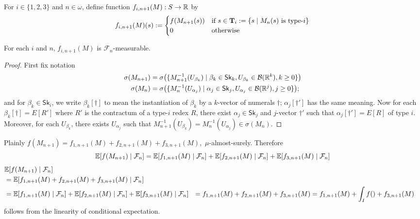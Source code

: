 \iffalse
For $i \in \{1, 2, 3\}$ and $n \in \omega$, define function $f_{i, n+1}(M) : S \to \mathbb{R}$ by
\[
f_{i, n+1}(M)(s) :=
\begin{cases}
f(M_{n+1}(s)) & \hbox{if }s \in \mathbf{T}_i := 
\{s \mid M_n(s) \textrm{ is type-$i$}\}\\
0 & \textrm{otherwise}
\end{cases}
\]
\begin{lemma}
\label{lem:inde}
For each $i$ and $n$, $f_{i, n+1}(M)$ is %
$\mathcal{F}_{n}$-measurable.
\end{lemma}

\begin{proof} First fix notation
\begin{align*}
\sigma(M_{n+1}) &= \sigma\big(\{M_{n+1}^{-1}(U_{\beta_k})
\mid \beta_k\in \mathsf{Sk}_k, U_{\beta_k} \in \mathcal{B}(\mathbb{R}^k), k \geq 0\}\big)\\
\sigma(M_{n}) &= \sigma\big(\{M_{n}^{-1}(U_{\alpha_j})
\mid \alpha_j\in \mathsf{Sk}_j, U_{\alpha_j} \in \mathcal{B}(\mathbb{R}^j), j \geq 0\}\big);
\end{align*}
and for $\beta_k \in \mathsf{Sk}_i$, we write $\beta_k[\dagger]$ to mean the instantiation of $\beta_k$ by a $k$-vector of numerals $\dagger$; $\alpha_j[\dagger']$ has the same meaning.
Now for each $\beta_k[\dagger] = E[R']$ where $R'$ is the contractum of a type-$i$ redex $R$, there exist $\alpha_j \in \mathsf{Sk}_j$ and $j$-vector $\dagger'$ such that $\alpha_j[\dagger'] = E[R]$ of type $i$.
Moreover, for each $U_{\beta_k}$, there exists $U_{\alpha_j}$ such that $M_{n+1}^{-1}(U_{\beta_k}) = M_{n}^{-1}(U_{\alpha_j}) \in \sigma(M_n)$.
\end{proof}

Plainly
\(
f(M_{n+1}) = %
f_{1, n+1}(M) + f_{2, n+1}(M) + f_{3, n+1}(M),
\)
$\mu$-almost-surely.
Therefore 
\[
\mathbb{E}[f(M_{n+1}) \mid \mathcal{F}_n] \nonumber \\
= 
\mathbb{E}[f_{1, n+1}(M) \mid \mathcal{F}_n] + \mathbb{E}[f_{2, n+1}(M) \mid \mathcal{F}_n] + \mathbb{E}[f_{3, n+1}(M) \mid \mathcal{F}_n] 
\]
\begin{align}
& \mathbb{E}[f(M_{n+1}) \mid \mathcal{F}_n] \nonumber \\
& = \mathbb{E}[f_{1, n+1}(M) + f_{2, n+1}(M) + f_{3, n+1}(M)  \mid \mathcal{F}_n] 
\nonumber \\
& = \mathbb{E}[f_{1, n+1}(M) \mid \mathcal{F}_n] + \mathbb{E}[f_{2, n+1}(M) \mid \mathcal{F}_n] + \mathbb{E}[f_{3, n+1}(M) \mid \mathcal{F}_n] 
\label{eqn:linear cond ex} 
& = f_{1, n+1}(M) + f_{2, n+1}(M) + f_{3, n+1}(M)
\label{eqn:inde cond exp}
& = f_{1, n+1}(M) + \int_I f() + f_{3, n+1}(M) \label{eqn:inde cond exp} \\
\end{align}
 follows from the linearity of conditional expectation. 

